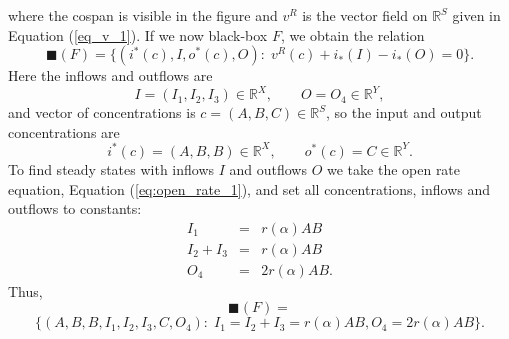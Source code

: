 \documentclass{compositionalityarticle}
\newcommand{\R}{\mathbb{R}}
\theoremstyle{compositionality}
\theoremstyle{remark}
\begin{document}
where the cospan is visible in the figure and $v^R$ is the vector field on $\R^S$ given in
Equation (\ref{eq_v_1}).  If we now black-box $F$, we obtain the relation
\[   \blacksquare(F) = \{  (i^*(c),I,o^*(c),O) : \; v^R(c) + i_*(I) - i_*(O) = 0 \}. \] 
Here the inflows and outflows are
\[   I = (I_1, I_2, I_3) \in \R^X, \qquad O = O_4 \in \R^Y, \]
and vector of concentrations is $c = (A,B,C) \in \R^S$, so the input and output 
concentrations are 
\[   i^*(c) = (A,B,B) \in \R^X, \qquad o^*(c) = C \in \R^Y .\]
To find steady states with inflows $I$ and outflows $O$ we take the open rate equation, Equation (\ref{eq:open_rate_1}), and set all concentrations, inflows and outflows to constants:
\[
\begin{array}{rcr} 
 I_1 &=& r(\alpha) AB\, \\ 
 I_2 + I_3 &=& r(\alpha) AB\, \\ 
 O_4 &=& 2r(\alpha) AB.
\end{array}
\]
Thus, 
\begin{equation}   
\label{eq:black_1}
\blacksquare(F) = 
\end{equation}
\[ \{(A,B,B,I_1,I_2,I_3,C,O_4): \; I_1 = I_2 + I_3 = r(\alpha) AB , 
 O_4 = 2r(\alpha) AB \}.\]
\end{document}
